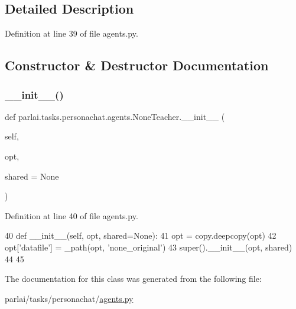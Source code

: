 \subsection{Detailed Description}


Definition at line 39 of file agents.\+py.



\subsection{Constructor \& Destructor Documentation}
\mbox{\label{classparlai_1_1tasks_1_1personachat_1_1agents_1_1NoneTeacher_af7f3226c57f6d0c8fce6d670b03a4c2a}} 
\subsubsection{\texorpdfstring{\+\_\+\+\_\+init\+\_\+\+\_\+()}{\_\_init\_\_()}}
{\footnotesize\ttfamily def parlai.\+tasks.\+personachat.\+agents.\+None\+Teacher.\+\_\+\+\_\+init\+\_\+\+\_\+ (\begin{DoxyParamCaption}\item[{}]{self,  }\item[{}]{opt,  }\item[{}]{shared = {\ttfamily None} }\end{DoxyParamCaption})}



Definition at line 40 of file agents.\+py.


\begin{DoxyCode}
40     \textcolor{keyword}{def }\_\_init\_\_(self, opt, shared=None):
41         opt = copy.deepcopy(opt)
42         opt[\textcolor{stringliteral}{'datafile'}] = \_path(opt, \textcolor{stringliteral}{'none\_original'})
43         super().\_\_init\_\_(opt, shared)
44 
45 
\end{DoxyCode}


The documentation for this class was generated from the following file\+:\begin{DoxyCompactItemize}
\item 
parlai/tasks/personachat/\hyperlink{parlai_2tasks_2personachat_2agents_8py}{agents.\+py}\end{DoxyCompactItemize}
